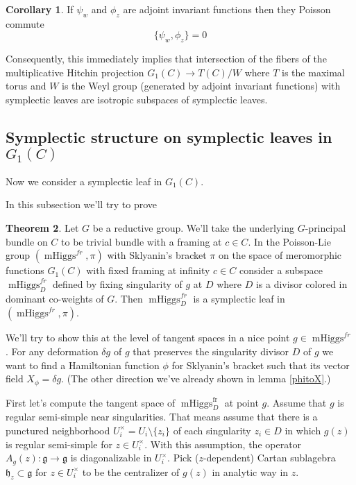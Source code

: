 \documentclass[11pt, oneside, reqno]{amsart}
\theoremstyle{definition} \newtheorem{definition}{Definition}[section]
\newtheorem{theorem}[definition]{Theorem}
\newtheorem{corollary}[definition]{Corollary}
\theoremstyle{definition} \newtheorem{remark}[definition]{Remark}
\theoremstyle{definition} \newtheorem{remarks}[definition]{Remarks}
\theoremstyle{definition} \newtheorem{question}[definition]{Question}
\theoremstyle{definition} \newtheorem*{note}{Note}
\theoremstyle{definition} \newtheorem{example}[definition]{Example}
\theoremstyle{definition} \newtheorem{examples}[definition]{Examples}
\renewcommand{\gg}{\mathfrak{g}}
\DeclareMathOperator{\mhiggs}{mHiggs}
\newcommand{\fr}{\mathrm{fr}}
\begin{document}
\begin{corollary}
  If $\psi_{w}$ and $\phi_{z}$ are adjoint invariant functions then they Poisson commute 
  \begin{equation}
    \{ \psi_{w}, \phi_{z} \} = 0
  \end{equation}
\end{corollary}

Consequently, this immediately implies that intersection
of the fibers of the multiplicative Hitchin
projection $G_1(C) \to T(C)/W$ where $T$ is the maximal torus and $W$ is the Weyl group (generated
by adjoint invariant functions) with symplectic leaves are isotropic subspaces of symplectic leaves.





\subsection{Symplectic structure on symplectic leaves in $G_1(C)$}

Now we consider a symplectic leaf in $G_1(C)$. 

In this subsection we'll try to prove
\begin{theorem}
  Let $G$ be a reductive group. We'll take the underlying $G$-principal bundle on $C$
  to be trivial bundle with a framing at $c \in C$. 
In the Poisson-Lie group $(\mhiggs^{fr}, \pi)$ with Sklyanin's bracket $\pi$
on the space of meromorphic functions $G_1(C)$ with fixed framing at infinity $c \in C$
consider a subspace  $\mhiggs^{fr}_{D}$
defined 
  by fixing singularity of $g$ at $D$ where $D$ is a divisor colored in dominant co-weights of $G$. Then $\mhiggs^{fr}_{D}$ is a symplectic leaf in $(\mhiggs^{fr}, \pi)$. 
\end{theorem}

We'll try to show this at the level of tangent spaces in a nice point $g \in \mhiggs^{fr}$.  For any deformation $\delta g $ of $g$ that
preserves the singularity divisor $D$ of $g$ we want to find a Hamiltonian
function $\phi$ for Sklyanin's bracket such that its vector field
$X_\phi = \delta g$.  (The other direction we've already shown in lemma \ref{phitoX}.)


First let's compute the tangent space of $\mhiggs_{D}^{\fr}$ at point $g$.
Assume that $g$ is regular semi-simple near singularities. That means assume
that there is a punctured neighborhood $U_i^{\times} = U_{i} \setminus \{z_i \}$ of each singularity $z_i \in D $ in which $g(z)$ is regular semi-simple for $z \in U_{i}^{\times}$. 
With this assumption, the operator $A_{g}(z): \gg \to \gg$ is diagonalizable in $U_{i}^{\times}$.
\newcommand{\hh}{\mathfrak{h}}
Pick ($z$-dependent) Cartan sublagebra $\hh_{z} \subset \gg$  for $z \in U_{i}^{\times}$
to be the centralizer of $g(z)$ in analytic way in $z$. 
\end{document}
